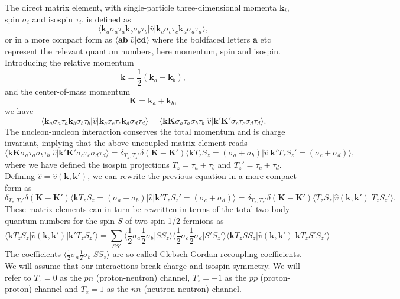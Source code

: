The direct matrix element, with single-particle three-dimensional
momenta $\mathbf{k}_i$, spin $\sigma_i$ and isospin $\tau_i$, is
defined as
\[
\langle \mathbf{k}_a\sigma_a\tau_a \mathbf{k}_b\sigma_b\tau_b \vert \hat{v}\vert \mathbf{k}_c\sigma_c\tau_c \mathbf{k}_d\sigma_d\tau_d \rangle, 
\]
or in a more compact form as
$\langle \mathbf{a}\mathbf{b}\vert \hat{v} \vert \mathbf{c}\mathbf{d} \rangle$
where the boldfaced letters $\mathbf{a}$ etc represent the relevant
quantum numbers, here momentum, spin and isospin. Introducing the
relative momentum
\[
\mathbf{k} = \frac{1}{2}\left(\mathbf{k}_a-\mathbf{k}_b\right), 
\]
and the center-of-mass momentum
\[
\mathbf{K} = \mathbf{k}_a+\mathbf{k}_b,
\]
we have 
\[
\langle \mathbf{k}_a\sigma_a\tau_a \mathbf{k}_b\sigma_b\tau_b \vert \hat{v}\vert \mathbf{k}_c\sigma_c\tau_c \mathbf{k}_d\sigma_d\tau_d \rangle=\langle \mathbf{k}\mathbf{K}\sigma_a\tau_a \sigma_b\tau_b \vert \hat{v}\vert \mathbf{k}'\mathbf{K}'\sigma_c\tau_c \sigma_d\tau_d \rangle.
\]
The nucleon-nucleon interaction conserves the total momentum and is
charge invariant, implying that the above uncoupled matrix element reads
\[
\langle \mathbf{k}\mathbf{K}\sigma_a\tau_a \sigma_b\tau_b \vert \hat{v}\vert \mathbf{k}'\mathbf{K}'\sigma_c\tau_c \sigma_d\tau_d \rangle=\delta_{T_z,T_z'}\delta(\mathbf{K}-\mathbf{K}')\langle \mathbf{k}T_zS_z=(\sigma_a+\sigma_b) \vert \hat{v}\vert \mathbf{k}'T_zS_z'=(\sigma_c+\sigma_d) \rangle,
\]
where we have defined the isospin projections $T_z=\tau_a+\tau_b$ and
$T_z'=\tau_c+\tau_d$.  Defining
$\hat{v}=\hat{v}(\mathbf{k},\mathbf{k}' )$, we can rewrite the
previous equation in a more compact form as
\[
\delta_{T_z,T_z'}\delta(\mathbf{K}-\mathbf{K}')\langle \mathbf{k}T_zS_z=(\sigma_a+\sigma_b) \vert \hat{v}\vert \mathbf{k}'T_zS_z'=(\sigma_c+\sigma_d) \rangle=\delta_{T_z,T_z'}\delta(\mathbf{K}-\mathbf{K}')\langle T_zS_z\vert\hat{v}(\mathbf{k},\mathbf{k}' ) \vert T_zS_z' \rangle.
\]
These matrix elements can in turn be rewritten in terms of the total
two-body quantum numbers for the spin $S$ of two spin-1/2 fermions as
\[
\langle \mathbf{k}T_zS_z \vert \hat{v}(\mathbf{k},\mathbf{k}' )\vert \mathbf{k}'T_zS_z' \rangle=\sum_{SS'}\langle \frac{1}{2}\sigma_a\frac{1}{2}\sigma_b\vert SS_z\rangle \langle \frac{1}{2}\sigma_c\frac{1}{2}\sigma_d\vert S'S_z'\rangle \langle \mathbf{k}T_zSS_z\vert \hat{v}(\mathbf{k},\mathbf{k}' )\vert \mathbf{k}T_zS'S_z' \rangle
\]
The coefficients $\langle \frac{1}{2}\sigma_a\frac{1}{2}\sigma_b\vert
SS_z\rangle$ are so-called Clebsch-Gordan recoupling coefficients.  We
will assume that our interactions break charge and isospin
symmetry. We will refer to $T_z=0$ as the $pn$ (proton-neutron)
channel, $T_z=-1$ as the $pp$ (proton-proton) channel and $T_z=1$ as
the $nn$ (neutron-neutron) channel.

